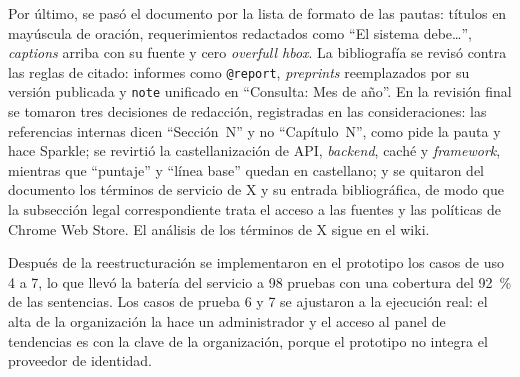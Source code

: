 Por último, se pasó el documento por la lista de formato de las pautas: títulos en mayúscula de oración, requerimientos redactados como \enquote{El sistema debe\ldots}, \emph{captions} arriba con su fuente y cero \emph{overfull hbox}. La bibliografía se revisó contra las reglas de citado: informes como \texttt{@report}, \emph{preprints} reemplazados por su versión publicada y \texttt{note} unificado en \enquote{Consulta: Mes de año}. En la revisión final se tomaron tres decisiones de redacción, registradas en las consideraciones: las referencias internas dicen \enquote{Sección~N} y no \enquote{Capítulo~N}, como pide la pauta y hace Sparkle; se revirtió la castellanización de API, \emph{backend}, caché y \emph{framework}, mientras que \enquote{puntaje} y \enquote{línea base} quedan en castellano; y se quitaron del documento los términos de servicio de X y su entrada bibliográfica, de modo que la subsección legal correspondiente trata el acceso a las fuentes y las políticas de Chrome Web Store. El análisis de los términos de X sigue en el wiki.

Después de la reestructuración se implementaron en el prototipo los casos de uso 4 a 7, lo que llevó la batería del servicio a 98 pruebas con una cobertura del 92~\% de las sentencias. Los casos de prueba 6 y 7 se ajustaron a la ejecución real: el alta de la organización la hace un administrador y el acceso al panel de tendencias es con la clave de la organización, porque el prototipo no integra el proveedor de identidad.

\bigskip
